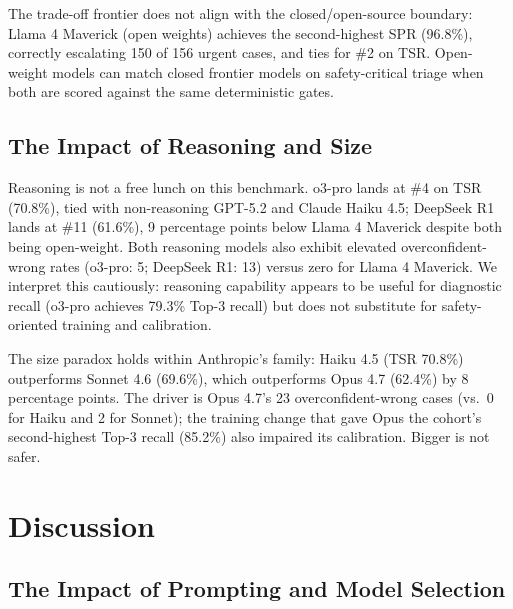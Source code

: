 \documentclass[11pt,a4paper]{article}
\begin{document}
{\color{red}The trade-off frontier does not align with the closed/open-source boundary: Llama 4 Maverick (open weights) achieves the second-highest SPR (96.8\%), correctly escalating 150 of 156 urgent cases, and ties for \#2 on TSR. Open-weight models can match closed frontier models on safety-critical triage when both are scored against the same deterministic gates.}

\subsection{The Impact of Reasoning and Size}

{\color{red}Reasoning is not a free lunch on this benchmark. o3-pro lands at \#4 on TSR (70.8\%), tied with non-reasoning GPT-5.2 and Claude Haiku 4.5; DeepSeek R1 lands at \#11 (61.6\%), 9 percentage points below Llama 4 Maverick despite both being open-weight. Both reasoning models also exhibit elevated overconfident-wrong rates (o3-pro: 5; DeepSeek R1: 13) versus zero for Llama 4 Maverick. We interpret this cautiously: reasoning capability appears to be useful for diagnostic recall (o3-pro achieves 79.3\% Top-3 recall) but does not substitute for safety-oriented training and calibration.}

{\color{red}The size paradox holds within Anthropic's family: Haiku 4.5 (TSR 70.8\%) outperforms Sonnet 4.6 (69.6\%), which outperforms Opus 4.7 (62.4\%) by 8 percentage points. The driver is Opus 4.7's 23 overconfident-wrong cases (vs.\ 0 for Haiku and 2 for Sonnet); the training change that gave Opus the cohort's second-highest Top-3 recall (85.2\%) also impaired its calibration. Bigger is not safer.}

\section{Discussion}

\subsection{The Impact of Prompting and Model Selection}
\end{document}
